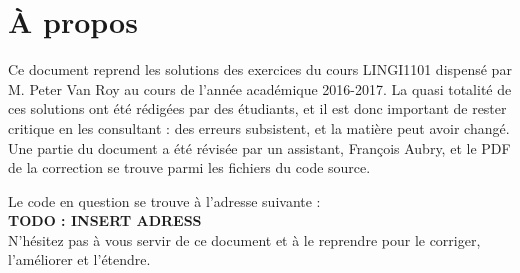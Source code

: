 \chapter*{À propos}
Ce document reprend les solutions des exercices du cours LINGI1101 dispensé par M. Peter Van Roy au cours de l'année académique 2016-2017.
La quasi totalité de ces solutions ont été rédigées par des étudiants, et il est donc important de rester critique en les consultant : des erreurs subsistent, et la matière peut avoir changé.
Une partie du document a été révisée par un assistant, François Aubry, et le PDF de la correction se trouve parmi les fichiers du code source.

Le code en question se trouve à l'adresse suivante :\\
\textbf{TODO : INSERT ADRESS}\\

N'hésitez pas à vous servir de ce document et à le reprendre pour le corriger, l'améliorer et l'étendre.